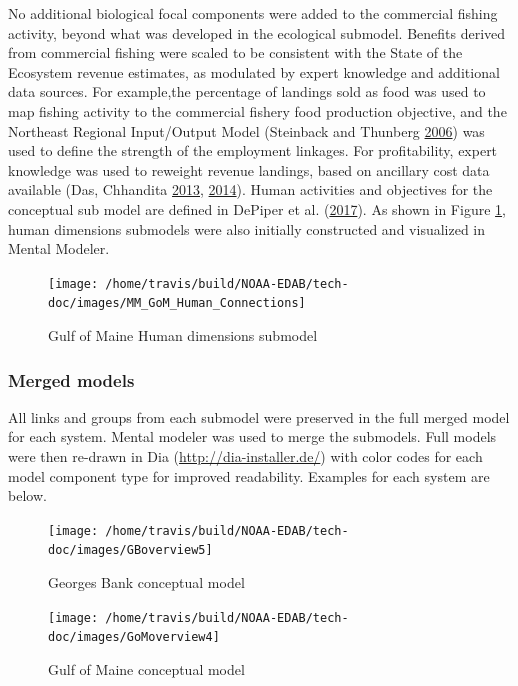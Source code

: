 \documentclass[
]{book}
\begin{document}
No additional biological focal components were added to the commercial fishing activity, beyond what was developed in the ecological submodel. Benefits derived from commercial fishing were scaled to be consistent with the State of the Ecosystem revenue estimates, as modulated by expert knowledge and additional data sources. For example,the percentage of landings sold as food was used to map fishing activity to the commercial fishery food production objective, and the Northeast Regional Input/Output Model (Steinback and Thunberg \protect\hyperlink{ref-steinback_scott_northeast_2006}{2006}) was used to define the strength of the employment linkages. For profitability, expert knowledge was used to reweight revenue landings, based on ancillary cost data available (Das, Chhandita \protect\hyperlink{ref-das_chhandita_northeast_2013}{2013}, \protect\hyperlink{ref-das_chhandita_overview_2014}{2014}). Human activities and objectives for the conceptual sub model are defined in DePiper et al. (\protect\hyperlink{ref-depiper_operationalizing_2017}{2017}). As shown in Figure \ref{fig:draftGOMhuman}, human dimensions submodels were also initially constructed and visualized in Mental Modeler.

\begin{figure}
\texttt{[image: /home/travis/build/NOAA-EDAB/tech-doc/images/MM\_GoM\_Human\_Connections]} \caption{Gulf of Maine Human dimensions submodel}\label{fig:draftGOMhuman}
\end{figure}

\hypertarget{merged-models}{%
\subsubsection{Merged models}\label{merged-models}}

All links and groups from each submodel were preserved in the full merged model for each system. Mental modeler was used to merge the submodels. Full models were then re-drawn in Dia (\url{http://dia-installer.de/}) with color codes for each model component type for improved readability. Examples for each system are below.

\begin{figure}
\texttt{[image: /home/travis/build/NOAA-EDAB/tech-doc/images/GBoverview5]} \caption{Georges Bank conceptual model}\label{fig:diaGB}
\end{figure}

\begin{figure}
\texttt{[image: /home/travis/build/NOAA-EDAB/tech-doc/images/GoMoverview4]} \caption{Gulf of Maine conceptual model}\label{fig:diaGOM}
\end{figure}
\end{document}
